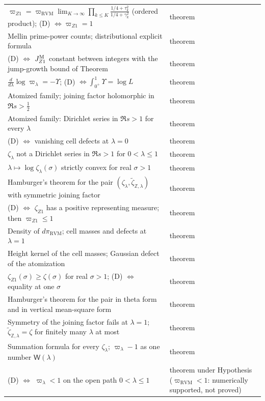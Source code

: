 \documentclass[11pt,reqno]{amsart}
\makeatletter
\let\CG@origref\ref
\newcommand{\CG@gettip}[1]{\@ifundefined{CGTip@#1}{Reference: #1}{\csname CGTip@#1\endcsname}}
\DeclareRobustCommand{\CGref}[1]{\pdftooltip{\CG@origref{#1}}{\CG@gettip{#1}}}
\numberwithin{equation}{section}
\theoremstyle{plain}
\theoremstyle{definition}
\theoremstyle{remark}
\newcommand{\Z}{\mathbb Z}
\newcommand{\RVM}{\mathrm{RVM}}
\makeatother
\begin{document}
\begin{longtable}{p{}p{}}
$\varpi_{Z1}=\varpi_{\RVM}\lim_{K\to\infty}\prod_{k\le K}\frac{1/4+\tau_k^2}{1/4+\gamma_k^2}$ (ordered product); (D) $\Leftrightarrow\varpi_{Z1}=1$ & theorem\\
Mellin prime-power counts; distributional explicit formula & theorem\\
(D) $\Leftrightarrow$ $J_{Z1}^{\rm M}$ constant between integers with the jump-growth bound of Theorem~\CGref{thm:cell-form} & theorem\\
$\frac d{d\lambda}\log\varpi_\lambda=-\Upsilon$; (D) $\Leftrightarrow\int_{0^+}^1\Upsilon=\log L$ & theorem\\
Atomized family; joining factor holomorphic in $\Re s>\frac12$ & theorem\\
Atomized family: Dirichlet series in $\Re s>1$ for every $\lambda$ & theorem\\
(D) $\Leftrightarrow$ vanishing cell defects at $\lambda=0$ & theorem\\
$\zeta_\lambda$ not a Dirichlet series in $\Re s>1$ for $0<\lambda\le1$ & theorem\\
$\lambda\mapsto\log\zeta_\lambda(\sigma)$ strictly convex for real $\sigma>1$ & theorem\\
Hamburger's theorem for the pair $(\zeta_\lambda,\tilde\zeta_{\Z,\lambda})$ with symmetric joining factor & theorem\\
(D) $\Leftrightarrow$ $\zeta_{Z1}$ has a positive representing measure; then $\varpi_{Z1}\le1$ & theorem\\
Density of $d\pi_{\RVM}$; cell masses and defects at $\lambda=1$ & theorem\\
Height kernel of the cell masses; Gaussian defect of the atomization & theorem\\
$\zeta_{Z1}(\sigma)\ge\zeta(\sigma)$ for real $\sigma>1$; (D) $\Leftrightarrow$ equality at one $\sigma$ & theorem\\
Hamburger's theorem for the pair in theta form and in vertical mean-square form & theorem\\
Symmetry of the joining factor fails at $\lambda=1$; $\tilde\zeta_{\Z,\lambda}=\zeta$ for finitely many $\lambda$ at most & theorem\\
Summation formula for every $\zeta_\lambda$; $\varpi_\lambda-1$ as one number $\mathsf W(\lambda)$ & theorem\\
(D) $\Leftrightarrow$ $\varpi_\lambda<1$ on the open path $0<\lambda\le1$ & theorem under Hypothesis~\CGref{hyp:varpi-less-one} ($\varpi_{\RVM}<1$: numerically supported, not proved)\\

\end{longtable}
\end{document}
